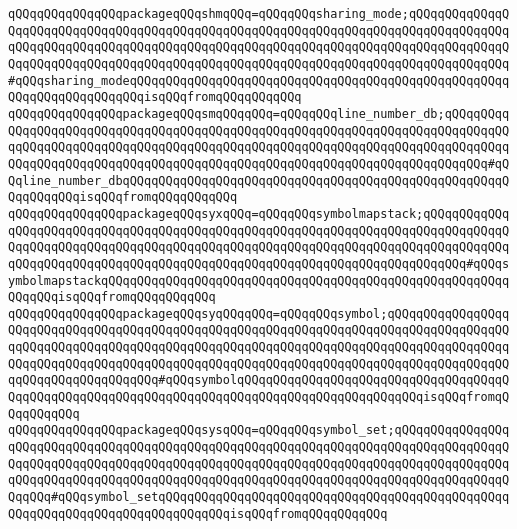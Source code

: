 \verb|qQQqqQQqqQQqqQQqpackageqQQqshmqQQq=qQQqqQQqsharing_mode;qQQqqQQqqQQqqQQqqQQqqQQqqQQqqQQqqQQqqQQqqQQqqQQqqQQqqQQqqQQqqQQqqQQqqQQqqQQqqQQqqQQqqQQqqQQqqQQqqQQqqQQqqQQqqQQqqQQqqQQqqQQqqQQqqQQqqQQqqQQqqQQqqQQqqQQqqQQqqQQqqQQqqQQqqQQqqQQqqQQqqQQqqQQqqQQqqQQqqQQqqQQqqQQqqQQqqQQqqQQqqQQq#qQQqsharing_modeqQQqqQQqqQQqqQQqqQQqqQQqqQQqqQQqqQQqqQQqqQQqqQQqqQQqqQQqqQQqqQQqqQQqqQQqisqQQqfromqQQqqQQqqQQq|\newline
\verb|qQQqqQQqqQQqqQQqpackageqQQqsmqQQqqQQq=qQQqqQQqline_number_db;qQQqqQQqqQQqqQQqqQQqqQQqqQQqqQQqqQQqqQQqqQQqqQQqqQQqqQQqqQQqqQQqqQQqqQQqqQQqqQQqqQQqqQQqqQQqqQQqqQQqqQQqqQQqqQQqqQQqqQQqqQQqqQQqqQQqqQQqqQQqqQQqqQQqqQQqqQQqqQQqqQQqqQQqqQQqqQQqqQQqqQQqqQQqqQQqqQQqqQQqqQQqqQQqqQQqqQQq#qQQqline_number_dbqQQqqQQqqQQqqQQqqQQqqQQqqQQqqQQqqQQqqQQqqQQqqQQqqQQqqQQqqQQqqQQqisqQQqfromqQQqqQQqqQQq|\newline
\verb|qQQqqQQqqQQqqQQqpackageqQQqsyxqQQq=qQQqqQQqsymbolmapstack;qQQqqQQqqQQqqQQqqQQqqQQqqQQqqQQqqQQqqQQqqQQqqQQqqQQqqQQqqQQqqQQqqQQqqQQqqQQqqQQqqQQqqQQqqQQqqQQqqQQqqQQqqQQqqQQqqQQqqQQqqQQqqQQqqQQqqQQqqQQqqQQqqQQqqQQqqQQqqQQqqQQqqQQqqQQqqQQqqQQqqQQqqQQqqQQqqQQqqQQqqQQqqQQqqQQqqQQq#qQQqsymbolmapstackqQQqqQQqqQQqqQQqqQQqqQQqqQQqqQQqqQQqqQQqqQQqqQQqqQQqqQQqqQQqqQQqisqQQqfromqQQqqQQqqQQq|\newline
\verb|qQQqqQQqqQQqqQQqpackageqQQqsyqQQqqQQq=qQQqqQQqsymbol;qQQqqQQqqQQqqQQqqQQqqQQqqQQqqQQqqQQqqQQqqQQqqQQqqQQqqQQqqQQqqQQqqQQqqQQqqQQqqQQqqQQqqQQqqQQqqQQqqQQqqQQqqQQqqQQqqQQqqQQqqQQqqQQqqQQqqQQqqQQqqQQqqQQqqQQqqQQqqQQqqQQqqQQqqQQqqQQqqQQqqQQqqQQqqQQqqQQqqQQqqQQqqQQqqQQqqQQqqQQqqQQqqQQqqQQqqQQqqQQqqQQqqQQq#qQQqsymbolqQQqqQQqqQQqqQQqqQQqqQQqqQQqqQQqqQQqqQQqqQQqqQQqqQQqqQQqqQQqqQQqqQQqqQQqqQQqqQQqqQQqqQQqqQQqqQQqisqQQqfromqQQqqQQqqQQq|\newline
\verb|qQQqqQQqqQQqqQQqpackageqQQqsysqQQq=qQQqqQQqsymbol_set;qQQqqQQqqQQqqQQqqQQqqQQqqQQqqQQqqQQqqQQqqQQqqQQqqQQqqQQqqQQqqQQqqQQqqQQqqQQqqQQqqQQqqQQqqQQqqQQqqQQqqQQqqQQqqQQqqQQqqQQqqQQqqQQqqQQqqQQqqQQqqQQqqQQqqQQqqQQqqQQqqQQqqQQqqQQqqQQqqQQqqQQqqQQqqQQqqQQqqQQqqQQqqQQqqQQqqQQqqQQqqQQqqQQqqQQq#qQQqsymbol_setqQQqqQQqqQQqqQQqqQQqqQQqqQQqqQQqqQQqqQQqqQQqqQQqqQQqqQQqqQQqqQQqqQQqqQQqqQQqqQQqisqQQqfromqQQqqQQqqQQq|\newline
